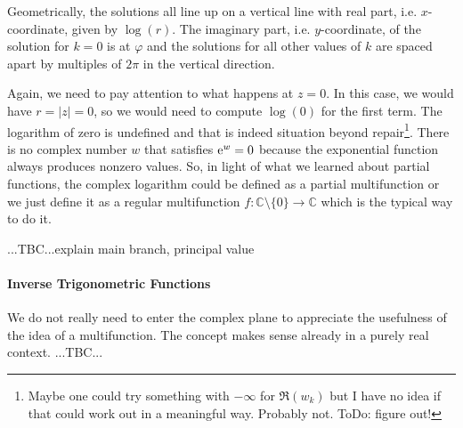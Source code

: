\medskip
Geometrically, the solutions all line up on a vertical line with real part, i.e. $x$-coordinate, given by $\log(r)$. The imaginary part, i.e. $y$-coordinate, of the solution for $k=0$ is at $\varphi$ and the solutions for all other values of $k$ are spaced apart by multiples of $2 \pi$ in the vertical direction.  

\medskip
Again, we need to pay attention to what happens at $z=0$. In this case, we would have $r = |z| = 0$, so we would need to compute $\log(0)$ for the first term. The logarithm of zero is undefined and that is indeed situation beyond repair\footnote{Maybe one could try something with $-\infty$ for $\Re(w_k)$ but I have no idea if that could work out in a meaningful way. Probably not. ToDo: figure out!}. There is no complex number $w$ that satisfies $\operatorname{\mathrm{e}}^w = 0$ because the exponential function always produces nonzero values. So, in light of what we learned about partial functions, the complex logarithm could be defined as a partial multifunction or we just define it as a regular multifunction $f: \mathbb{C} \setminus \{ 0 \} \rightarrow \mathbb{C}$ which is the typical way to do it.

...TBC...explain main branch, principal value








\paragraph{Inverse Trigonometric Functions} 
We do not really need to enter the complex plane to appreciate the usefulness of the idea of a multifunction. The concept makes sense already in a purely real context. ...TBC...

